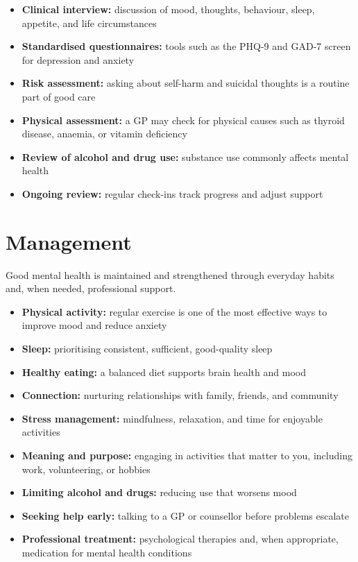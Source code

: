 \begin{itemize}
    \item \textbf{Clinical interview:} discussion of mood, thoughts, behaviour, sleep, appetite, and life circumstances
    \item \textbf{Standardised questionnaires:} tools such as the PHQ-9 and GAD-7 screen for depression and anxiety
    \item \textbf{Risk assessment:} asking about self-harm and suicidal thoughts is a routine part of good care
    \item \textbf{Physical assessment:} a GP may check for physical causes such as thyroid disease, anaemia, or vitamin deficiency
    \item \textbf{Review of alcohol and drug use:} substance use commonly affects mental health
    \item \textbf{Ongoing review:} regular check-ins track progress and adjust support
\end{itemize}

\section*{Management}
Good mental health is maintained and strengthened through everyday habits and, when needed, professional support.

\begin{itemize}
    \item \textbf{Physical activity:} regular exercise is one of the most effective ways to improve mood and reduce anxiety
    \item \textbf{Sleep:} prioritising consistent, sufficient, good-quality sleep
    \item \textbf{Healthy eating:} a balanced diet supports brain health and mood
    \item \textbf{Connection:} nurturing relationships with family, friends, and community
    \item \textbf{Stress management:} mindfulness, relaxation, and time for enjoyable activities
    \item \textbf{Meaning and purpose:} engaging in activities that matter to you, including work, volunteering, or hobbies
    \item \textbf{Limiting alcohol and drugs:} reducing use that worsens mood
    \item \textbf{Seeking help early:} talking to a GP or counsellor before problems escalate
    \item \textbf{Professional treatment:} psychological therapies and, when appropriate, medication for mental health conditions
\end{itemize}

